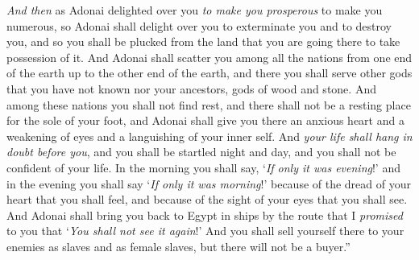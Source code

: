 \begin{biblechapter}
\verse \textit{And then} as Adonai delighted over you \textit{to make you prosperous} to make you numerous, so Adonai shall delight over you to exterminate you and to destroy you, and so you shall be plucked from the land that you are going there to take possession of it.
\verse And Adonai shall scatter you among all the nations from one end of the earth up to the other end of the earth, and there you shall serve other gods that you have not known nor your ancestors, gods of wood and stone.
\verse And among these nations you shall not find rest, and there shall not be a resting place for the sole of your foot, and Adonai shall give you there an anxious heart and a weakening of eyes and a languishing of your inner self.
\verse And \textit{your life shall hang in doubt before you}, and you shall be startled night and day, and you shall not be confident of your life.
\verse In the morning you shall say, ‘\textit{If only it was evening}!’ and in the evening you shall say ‘\textit{If only it was morning}!’ because of the dread of your heart that you shall feel, and because of the sight of your eyes that you shall see.
\verse And Adonai shall bring you back to Egypt in ships by the route that I \textit{promised} to you that ‘\textit{You shall not see it again}!’ And you shall sell yourself there to your enemies as slaves and as female slaves, but there will not be a buyer.”
\end{biblechapter}

